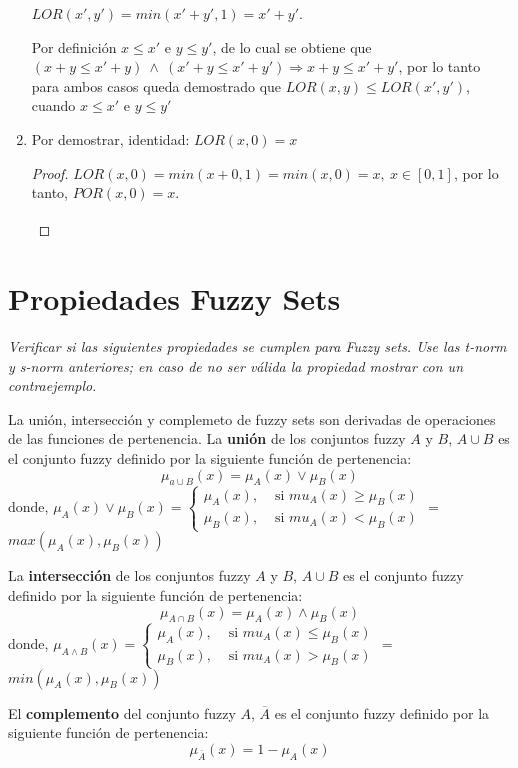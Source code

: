 \documentclass[letterpaper,spanish,11pt]{article}
\begin{document}
\begin{enumerate}
$LOR(x',y') = min (x'+y',1)=x'+y'$.
 
Por definici\'{o}n $x\leq x'$ e $y\leq y' $, de lo cual se obtiene que  $(x + y \leq  x'+y) \ \wedge \  (x'+y \leq x'+y') \Rightarrow x + y \leq x'+y'$, por lo tanto para ambos casos queda demostrado que $LOR(x,y) \leq LOR(x',y')$, cuando  $x\leq x'$ e $y\leq y'$ 


\item Por demostrar, identidad: $LOR(x,0)=x$
\begin{proof}
$LOR(x,0)=min(x + 0,1)=min(x,0)=x, \ x \in [0,1]$, por lo tanto, $POR(x,0)=x$.
\[\qedhere\]
\end{proof}


\end{enumerate}


\section{Propiedades Fuzzy Sets}
\emph{Verificar si las siguientes propiedades se cumplen para Fuzzy sets. Use las
t-norm y s-norm anteriores; en caso de no ser v\'{a}lida la propiedad mostrar
con un contraejemplo}.

\vspace{0.5cm}
La uni\'{o}n, intersecci\'{o}n y complemeto de fuzzy sets son derivadas de operaciones de las funciones de pertenencia.
La \textbf{uni\'{o}n} de los conjuntos fuzzy $A$ y $B$, $A\cup B$ es el conjunto fuzzy definido por la siguiente funci\'{o}n de pertenencia:
$$\mu_{a\cup B}(x) = \mu_{A}(x) \vee \mu_{B}(x)$$
donde,
$\mu_{A}(x) \vee \mu_{B}(x) =\begin{cases} \mu_{A}(x), & \text{ si } mu_{A}(x) \geq \mu_{B}(x) \\ \mu_{B}(x), & \text{ si } mu_{A}(x) < \mu_{B}(x) \end{cases}$ = $max(\mu_{A}(x),\mu_{B}(x))$

La \textbf{intersecci\'{o}n} de los conjuntos fuzzy $A$ y $B$, $A\cup B$ es el conjunto fuzzy definido por la siguiente funci\'{o}n de pertenencia:
$$\mu_{A \cap B}(x) = \mu_{A}(x) \wedge \mu_{B}(x)$$
donde,
$\mu_{A \wedge B}(x) =\begin{cases} \mu_{A}(x), & \text{ si } mu_{A}(x) \leq \mu_{B}(x) \\ \mu_{B}(x), & \text{ si } mu_{A}(x) > \mu_{B}(x) \end{cases}$ = $min(\mu_{A}(x),\mu_{B}(x))$

El \textbf{complemento} del conjunto fuzzy $A$, $\overline{A}$ es el conjunto
fuzzy definido por la siguiente funci\'{o}n de pertenencia:
$$\mu_{\overline{A}}(x)=1-\mu_{A}(x)$$
\end{document}
